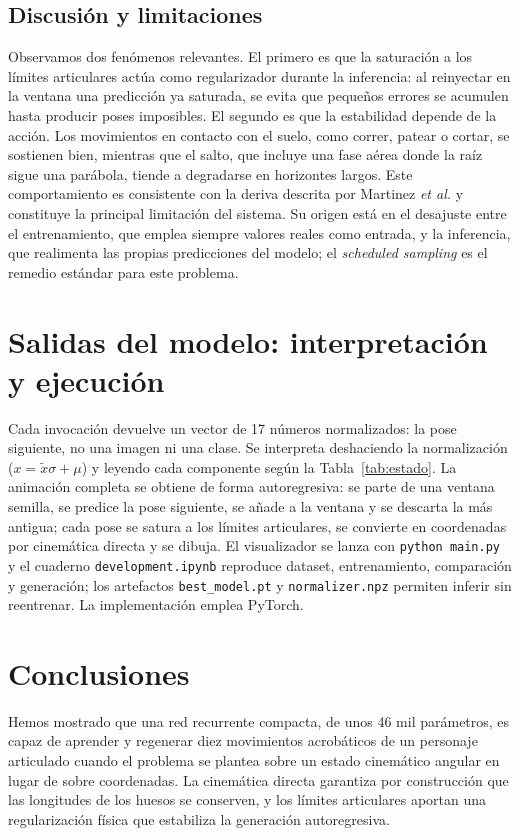 \documentclass[10pt,twocolumn]{article}
\begin{document}
\subsection{Discusión y limitaciones}
Observamos dos fenómenos relevantes. El primero es que la saturación a los
límites articulares actúa como regularizador durante la inferencia: al reinyectar
en la ventana una predicción ya saturada, se evita que pequeños errores se
acumulen hasta producir poses imposibles. El segundo es que la estabilidad
depende de la acción. Los movimientos en contacto con el suelo, como correr,
patear o cortar, se sostienen bien, mientras que el salto, que incluye una fase
aérea donde la raíz sigue una parábola, tiende a degradarse en horizontes largos.
Este comportamiento es consistente con la deriva descrita por Martinez
\emph{et al.} \cite{martinez} y constituye la principal limitación del sistema.
Su origen está en el desajuste entre el entrenamiento, que emplea siempre valores
reales como entrada, y la inferencia, que realimenta las propias predicciones del
modelo; el \emph{scheduled sampling} \cite{scheduled} es el remedio estándar para
este problema.

\section{Salidas del modelo: interpretación y ejecución}
Cada invocación devuelve un vector de 17 números normalizados: la pose siguiente,
no una imagen ni una clase. Se interpreta deshaciendo la normalización
($x=\tilde{x}\sigma+\mu$) y leyendo cada componente según la
Tabla~\ref{tab:estado}. La animación completa se obtiene de forma autoregresiva:
se parte de una ventana semilla, se predice la pose siguiente, se añade a la
ventana y se descarta la más antigua; cada pose se satura a los límites
articulares, se convierte en coordenadas por cinemática directa y se dibuja. El
visualizador se lanza con \texttt{python main.py} y el cuaderno
\texttt{development.ipynb} reproduce dataset, entrenamiento, comparación y
generación; los artefactos \texttt{best\_model.pt} y \texttt{normalizer.npz}
permiten inferir sin reentrenar. La implementación emplea PyTorch.

\section{Conclusiones}
Hemos mostrado que una red recurrente compacta, de unos 46 mil parámetros, es
capaz de aprender y regenerar diez movimientos acrobáticos de un personaje
articulado cuando el problema se plantea sobre un estado cinemático angular en
lugar de sobre coordenadas. La cinemática directa garantiza por construcción que
las longitudes de los huesos se conserven, y los límites articulares aportan una
regularización física que estabiliza la generación autoregresiva.
\end{document}
